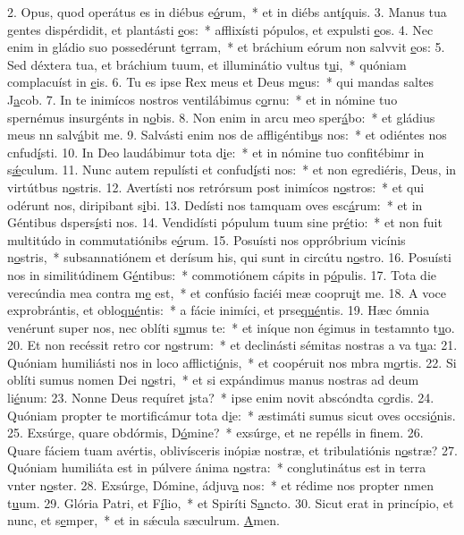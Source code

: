 2. Opus, quod operátus es in diébus e\uline{ó}rum,~* et in diébs ant\uline{í}quis.
3. Manus tua gentes dispérdidit, et plantásti \uline{e}os:~* afflixísti pópulos, et expulsti \uline{e}os.
4. Nec enim in gládio suo possedérunt t\uline{e}rram,~* et bráchium eórum non salvvit \uline{e}os:
5. Sed déxtera tua, et bráchium tuum, et illuminátio vultus t\uline{u}i,~* quóniam complacuíst in \uline{e}is.
6. Tu es ipse Rex meus et Deus m\uline{e}us:~* qui mandas saltes J\uline{a}cob.
7. In te inimícos nostros ventilábimus c\uline{o}rnu:~* et in nómine tuo spernémus insurgénts in n\uline{o}bis.
8. Non enim in arcu meo sper\uline{á}bo:~* et gládius meus nn salv\uline{á}bit me.
9. Salvásti enim nos de affligéntib\uline{u}s nos:~* et odiéntes nos cnfud\uline{í}sti.
10. In Deo laudábimur tota d\uline{i}e:~* et in nómine tuo confitébimr in s\uline{ǽ}culum.
11. Nunc autem repulísti et confud\uline{í}sti nos:~* et non egrediéris, Deus, in virtútbus n\uline{o}stris.
12. Avertísti nos retrórsum post inimícos n\uline{o}stros:~* et qui odérunt nos, diripibant s\uline{i}bi.
13. Dedísti nos tamquam oves esc\uline{á}rum:~* et in Géntibus dspers\uline{í}sti nos.
14. Vendidísti pópulum tuum sine pr\uline{é}tio:~* et non fuit multitúdo in commutatiónibs e\uline{ó}rum.
15. Posuísti nos oppróbrium vicínis n\uline{o}stris,~* subsannatiónem et derísum his, qui sunt in circútu n\uline{o}stro.
16. Posuísti nos in similitúdinem G\uline{é}ntibus:~* commotiónem cápits in p\uline{ó}pulis.
17. Tota die verecúndia mea contra m\uline{e} est,~* et confúsio faciéi meæ coopru\uline{i}t me.
18. A voce exprobrántis, et oblo\uline{qué}ntis:~* a fácie inimíci, et prse\uline{qué}ntis.
19. Hæc ómnia venérunt super nos, nec oblíti s\uline{u}mus te:~* et iníque non égimus in testamnto t\uline{u}o.
20. Et non recéssit retro cor n\uline{o}strum:~* et declinásti sémitas nostras a va t\uline{u}a:
21. Quóniam humiliásti nos in loco afflicti\uline{ó}nis,~* et coopéruit nos mbra m\uline{o}rtis.
22. Si oblíti sumus nomen Dei n\uline{o}stri,~* et si expándimus manus nostras ad deum li\uline{é}num:
23. Nonne Deus requíret \uline{i}sta?~* ipse enim novit abscóndta c\uline{o}rdis.
24. Quóniam propter te mortificámur tota d\uline{i}e:~* æstimáti sumus sicut oves occsi\uline{ó}nis.
25. Exsúrge, quare obdórmis, D\uline{ó}mine?~* exsúrge, et ne repélls in f\uline{i}nem.
26. Quare fáciem tuam avértis, oblivísceris inópiæ nostræ, et tribulatiónis n\uline{o}stræ?
27. Quóniam humiliáta est in púlvere ánima n\uline{o}stra:~* conglutinátus est in terra vnter n\uline{o}ster.
28. Exsúrge, Dómine, ádjuv\uline{a} nos:~* et rédime nos propter nmen t\uline{u}um.
29. Glória Patri, et F\uline{í}lio,~* et Spiríti S\uline{a}ncto.
30. Sicut erat in princípio, et nunc, et s\uline{e}mper,~* et in sǽcula sæculrum. \uline{A}men.
